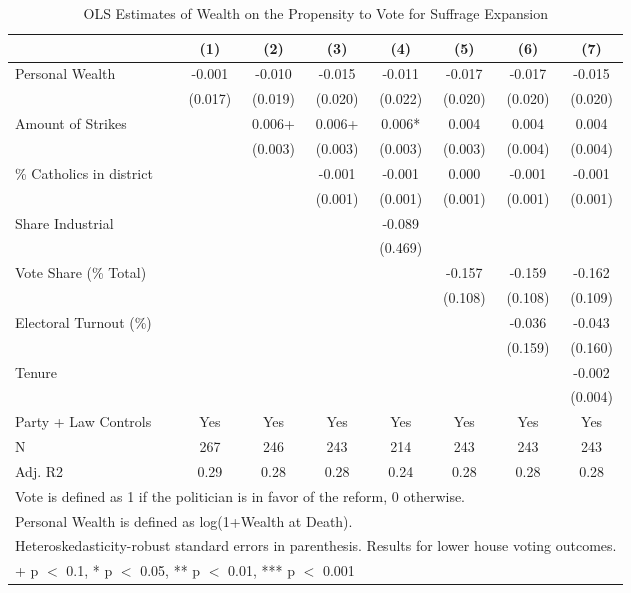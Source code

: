 \begin{table}

\caption{\label{tab:ivresults_othermodels2}OLS Estimates of Wealth on the Propensity to Vote for Suffrage Expansion}
\centering
\begin{tabular}[t]{lccccccc}
\toprule
  & (1) & (2) & (3) & (4) & (5) & (6) & (7)\\
\midrule
Personal Wealth & -0.001 & -0.010 & -0.015 & -0.011 & -0.017 & -0.017 & -0.015\\
 & (0.017) & (0.019) & (0.020) & (0.022) & (0.020) & (0.020) & (0.020)\\
Amount of Strikes &  & 0.006+ & 0.006+ & 0.006* & 0.004 & 0.004 & 0.004\\
 &  & (0.003) & (0.003) & (0.003) & (0.003) & (0.004) & (0.004)\\
\% Catholics in district &  &  & -0.001 & -0.001 & 0.000 & -0.001 & -0.001\\
 &  &  & (0.001) & (0.001) & (0.001) & (0.001) & (0.001)\\
Share Industrial &  &  &  & -0.089 &  &  & \\
 &  &  &  & (0.469) &  &  & \\
Vote Share (\% Total) &  &  &  &  & -0.157 & -0.159 & -0.162\\
 &  &  &  &  & (0.108) & (0.108) & (0.109)\\
Electoral Turnout (\%) &  &  &  &  &  & -0.036 & -0.043\\
 &  &  &  &  &  & (0.159) & (0.160)\\
Tenure &  &  &  &  &  &  & -0.002\\
 &  &  &  &  &  &  & (0.004)\\
\midrule
Party + Law Controls & Yes & Yes & Yes & Yes & Yes & Yes & Yes\\
N & 267 & 246 & 243 & 214 & 243 & 243 & 243\\
Adj. R2 & 0.29 & 0.28 & 0.28 & 0.24 & 0.28 & 0.28 & 0.28\\
\bottomrule
\multicolumn{8}{l}{\rule{0pt}{1em}Vote is defined as 1 if the politician is in favor of the reform, 0 otherwise.}\\
\multicolumn{8}{l}{\rule{0pt}{1em}Personal Wealth is defined as log(1+Wealth at Death).}\\
\multicolumn{8}{l}{\rule{0pt}{1em}Heteroskedasticity-robust standard errors in parenthesis. Results for lower house voting outcomes.}\\
\multicolumn{8}{l}{\rule{0pt}{1em}+ p $<$ 0.1, * p $<$ 0.05, ** p $<$ 0.01, *** p $<$ 0.001}\\
\end{tabular}
\end{table}
